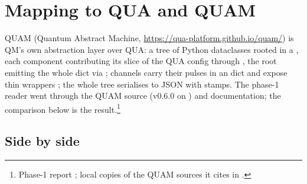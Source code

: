 \section{Mapping to QUA and QUAM}
\label{sec:quam}

QUAM (Quantum Abstract Machine, \url{https://qua-platform.github.io/quam/})
is QM's own abstraction layer over QUA: a tree of Python dataclasses rooted
in a , each component contributing its slice of the QUA config
through , the root emitting the whole dict via
; channels carry their pulses in an
 dict and expose thin wrappers ; the whole tree serialises to JSON with
 stamps. The phase-1 reader went through the QUAM source
(v0.6.0 on ) and documentation; the comparison below is the
result.\footnote{Phase-1 report ; local copies of the
QUAM sources it cites in .}

\subsection{Side by side}

